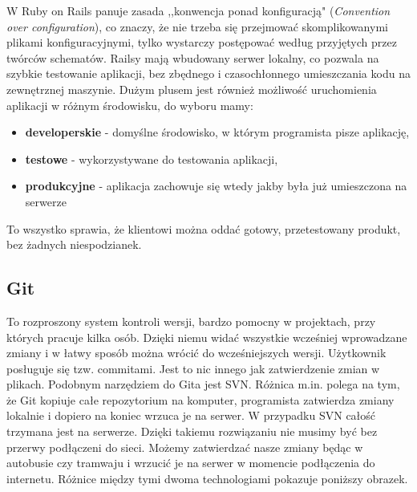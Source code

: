   W Ruby on Rails panuje zasada ,,konwencja ponad konfiguracją" (\emph{Convention over configuration}), co znaczy, że nie trzeba się przejmować skomplikowanymi plikami konfiguracyjnymi, tylko wystarczy postępować według przyjętych przez twórców schematów. Railsy mają wbudowany serwer lokalny, co pozwala na szybkie testowanie aplikacji, bez zbędnego i czasochłonnego umieszczania kodu na zewnętrznej maszynie. Dużym plusem jest również możliwość uruchomienia aplikacji w różnym środowisku, do wyboru mamy:
  \begin{itemize}
    \item \textbf{developerskie} - domyślne środowisko, w którym programista pisze aplikację,
    \item \textbf{testowe} - wykorzystywane do testowania aplikacji,
    \item \textbf{produkcyjne} - aplikacja zachowuje się wtedy jakby była już umieszczona na serwerze
  \end{itemize}
  To wszystko sprawia, że klientowi można oddać gotowy, przetestowany produkt, bez żadnych niespodzianek.

  \subsection{Git}
   \label{sec:GIT}
  To rozproszony system kontroli wersji, bardzo pomocny w projektach, przy których pracuje kilka osób. Dzięki niemu widać wszystkie  wcześniej wprowadzane zmiany i w łatwy sposób można wrócić do wcześniejszych wersji. Użytkownik posługuje się tzw. commitami. Jest to nic innego jak zatwierdzenie zmian w plikach. Podobnym narzędziem do Gita jest SVN. Różnica m.in. polega na tym, że Git kopiuje całe repozytorium na komputer, programista zatwierdza zmiany lokalnie i dopiero na koniec wrzuca je na serwer. W przypadku SVN całość trzymana jest na serwerze.
  Dzięki takiemu rozwiązaniu nie musimy być bez przerwy podłączeni do sieci. Możemy zatwierdzać nasze zmiany będąc w autobusie czy tramwaju i wrzucić je na serwer w momencie podłączenia do internetu.
  Różnice między tymi dwoma technologiami pokazuje poniższy obrazek.

